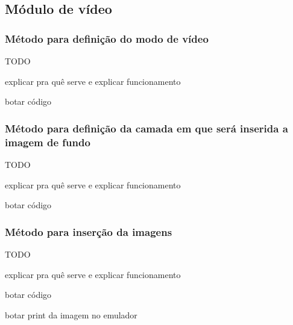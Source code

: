 \subsection{Módulo de vídeo}

  \subsubsection{Método para definição do modo de vídeo}

  TODO

  explicar pra quê serve e explicar funcionamento

  botar código

  \subsubsection{Método para definição da camada em que será inserida a imagem de fundo}

  TODO

  explicar pra quê serve e explicar funcionamento

  botar código

  \subsubsection{Método para inserção da imagens}

TODO

explicar pra quê serve e explicar funcionamento

botar código

botar print da imagem no emulador